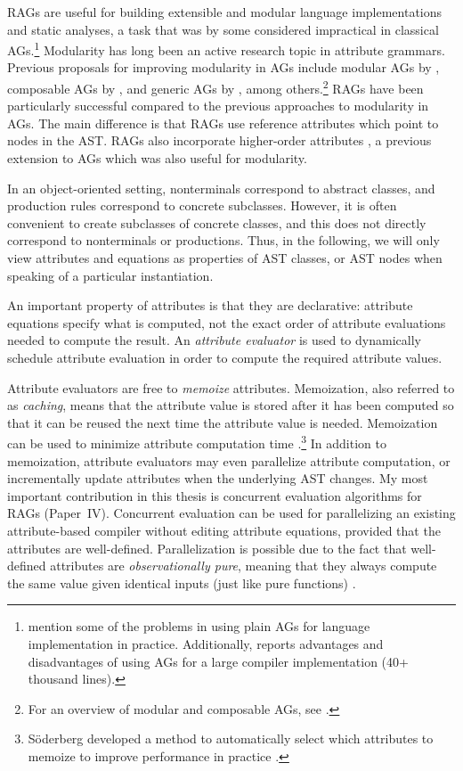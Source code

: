 \documentclass[10pt, twoside, openright]{book}
\begin{document}
RAGs are useful for building extensible and modular language implementations
and static analyses, a task that was by some considered impractical in classical AGs.\footnote{%
\textcite{DBLP:journals/cj/DueckC90} mention some of the problems in using plain AGs for language implementation in practice.
Additionally, \textcite{DBLP:conf/pldi/FarrowS89} reports advantages and disadvantages of using AGs
for a large compiler implementation (40+ thousand lines).}
Modularity has long been an active research topic in attribute grammars.
Previous proposals for improving modularity in AGs include
modular AGs by \textcite{DBLP:journals/cj/DueckC90},
composable AGs by \textcite{DBLP:conf/popl/FarrowMY92},
and generic AGs by \textcite{saraiva1999generic},
among others.\footnote{For an overview of modular and composable AGs, see \textcite{DBLP:journals/acta/KastensW94}.}
RAGs have been particularly successful compared to the previous approaches to modularity
in AGs. The main difference is that RAGs use reference attributes which point to nodes in the AST.
RAGs also incorporate higher-order attributes \cite{DBLP:conf/pldi/VogtSK89}, a
previous extension to AGs which was also useful for modularity.

In an object-oriented setting, nonterminals correspond to abstract classes, and production rules
correspond to concrete subclasses. However, it is often convenient to
create subclasses of concrete classes, and this does not directly correspond to
nonterminals or productions. Thus, in the following, we will only view attributes and
equations as properties of AST classes, or AST nodes when speaking of a particular instantiation.

An important property of attributes is that they are declarative:
attribute equations specify what is computed, not the exact order of attribute
evaluations needed to compute the result.
An \emph{attribute evaluator} is used to dynamically schedule attribute evaluation in order
to compute the required attribute values.

Attribute evaluators are free to \emph{memoize} attributes. Memoization, also referred to
as \emph{caching}, means that the
attribute value is stored after it has been computed so that it can be reused the next time the
attribute value is needed.  Memoization can be used to
minimize attribute computation time \cite{DBLP:conf/programm/Jourdan84}.\footnote{%
Söderberg developed a
method to automatically select which attributes to memoize to improve performance in practice \cite{DBLP:conf/sle/SoderbergH10}.}
In addition to memoization, attribute evaluators may even parallelize attribute
computation, or incrementally update attributes when the underlying AST changes.
My most important contribution in this thesis is concurrent evaluation
algorithms for RAGs (Paper~IV).
Concurrent evaluation can be used for parallelizing an existing attribute-based compiler
without editing attribute equations, provided that the attributes are well-defined.
Parallelization is possible due to the fact that well-defined attributes are
\emph{observationally pure}, meaning
that they always compute the same value given identical inputs (just like pure functions)
\cite{DBLP:conf/fase/Naumann05}.
\end{document}
